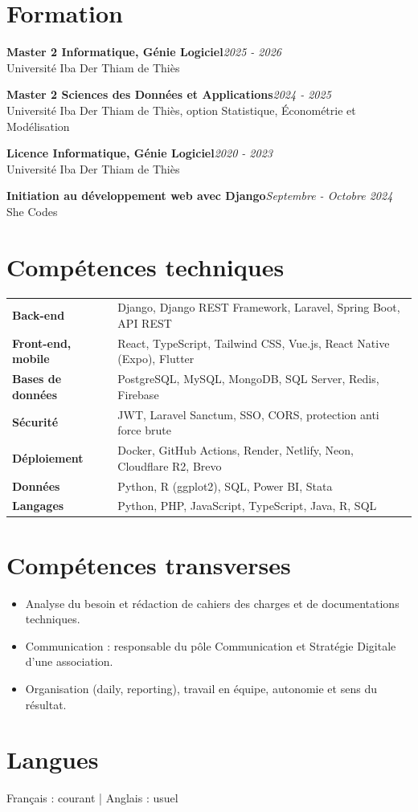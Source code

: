 \documentclass[10pt,a4paper]{article}
\newcommand{\poste}[3]{%
  {\bfseries #1}\hfill{\color{gris}\itshape #3}\\
  {\color{bleu}#2}\par\vspace{2pt}}
\begin{document}
\section{Formation}
\poste{Master 2 Informatique, Génie Logiciel}{Université Iba Der Thiam de Thiès}{2025 - 2026}
\vspace{3pt}
\poste{Master 2 Sciences des Données et Applications}{Université Iba Der Thiam de Thiès, option Statistique, Économétrie et Modélisation}{2024 - 2025}
\vspace{3pt}
\poste{Licence Informatique, Génie Logiciel}{Université Iba Der Thiam de Thiès}{2020 - 2023}
\vspace{3pt}
\poste{Initiation au développement web avec Django}{She Codes}{Septembre - Octobre 2024}

\section{Compétences techniques}
\begin{tabularx}{\linewidth}{@{}>{\bfseries}p{3.6cm}X@{}}
Back-end           & Django, Django REST Framework, Laravel, Spring Boot, API REST \\[2pt]
Front-end, mobile  & React, TypeScript, Tailwind CSS, Vue.js, React Native (Expo), Flutter \\[2pt]
Bases de données   & PostgreSQL, MySQL, MongoDB, SQL Server, Redis, Firebase \\[2pt]
Sécurité           & JWT, Laravel Sanctum, SSO, CORS, protection anti force brute \\[2pt]
Déploiement        & Docker, GitHub Actions, Render, Netlify, Neon, Cloudflare R2, Brevo \\[2pt]
Données            & Python, R (ggplot2), SQL, Power BI, Stata \\[2pt]
Langages           & Python, PHP, JavaScript, TypeScript, Java, R, SQL \\
\end{tabularx}

\section{Compétences transverses}
\begin{itemize}
  \item Analyse du besoin et rédaction de cahiers des charges et de documentations techniques.
  \item Communication : responsable du pôle Communication et Stratégie Digitale d'une association.
  \item Organisation (daily, reporting), travail en équipe, autonomie et sens du résultat.
\end{itemize}

\section{Langues}
Français : courant \;|\; Anglais : usuel
\end{document}
